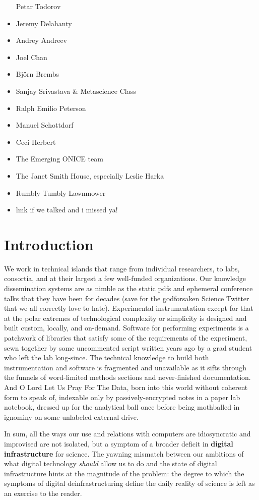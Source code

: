 \documentclass[10pt]{tufte-book}
\begin{document}
\begin{itemize}
  Petar Todorov
\item
  Jeremy Delahanty
\item
  Andrey Andreev
\item
  Joel Chan
\item
  Björn Brembs
\item
  Sanjay Srivastava \& Metascience Class
\item
  Ralph Emilio Peterson
\item
  Manuel Schottdorf
\item
  Ceci Herbert
\item
  The Emerging ONICE team
\item
  The Janet Smith House, especially Leslie Harka
\item
  Rumbly Tumbly Lawnmower
\item
  lmk if we talked and i missed ya!
\end{itemize}


\section{Introduction}



 We work in technical islands that range from individual
researchers, to labs, consortia, and at their largest a few well-funded
organizations. Our knowledge dissemination systems are as nimble as the
static pdfs and ephemeral conference talks that they have been for
decades (save for the godforsaken Science Twitter that we all correctly
love to hate). Experimental instrumentation except for that at the polar
extremes of technological complexity or simplicity is designed and built
custom, locally, and on-demand. Software for performing experiments is a
patchwork of libraries that satisfy some of the requirements of the
experiment, sewn together by some uncommented script written years ago
by a grad student who left the lab long-since. The technical knowledge
to build both instrumentation and software is fragmented and unavailable
as it sifts through the funnels of word-limited methods sections and
never-finished documentation. And O Lord Let Us Pray For The Data, born
into this world without coherent form to speak of, indexable only by
passively-encrypted notes in a paper lab notebook, dressed up for the
analytical ball once before being mothballed in ignominy on some
unlabeled external drive.

In sum, all the ways our use and relations with computers are
idiosyncratic and improvised are not isolated, but a symptom of a
broader deficit in \textbf{digital infrastructure} for science. The
yawning mismatch between our ambitions of what digital technology
\emph{should} allow us to do and the state of digital infrastructure
hints at the magnitude of the problem: the degree to which the symptoms
of digital deinfrastructuring define the daily reality of science is
left as an exercise to the reader.
\end{document}
